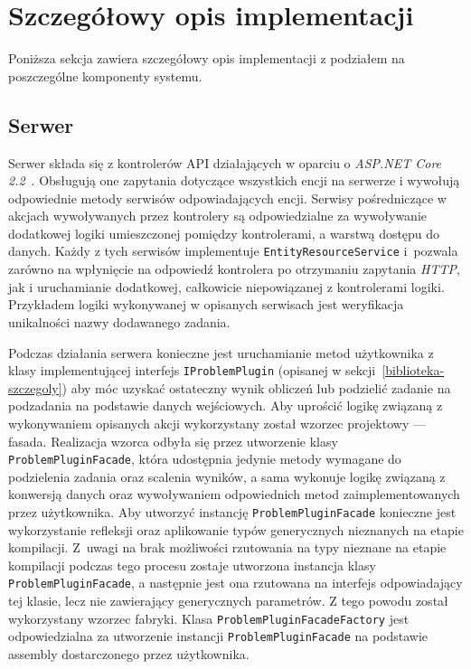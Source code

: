 \documentclass[a4paper,11pt,twoside]{report}
\theoremstyle{definition}
\begin{document}
\section{Szczegółowy opis implementacji}
\label{szczegolowy-opis-implementacji}

Poniższa sekcja zawiera szczegółowy opis implementacji z podziałem na poszczególne komponenty systemu.


\subsection{Serwer}

Serwer składa się z kontrolerów API działających w oparciu o \textit{ASP.NET Core 2.2}~\cite{aspnet-core}.
Obsługują one zapytania dotyczące wszystkich encji na serwerze i wywołują odpowiednie metody serwisów odpowiadających encji.
Serwisy pośredniczące w akcjach wywoływanych przez kontrolery są odpowiedzialne za wywoływanie dodatkowej logiki umieszczonej pomiędzy kontrolerami, a warstwą dostępu do danych.
Każdy z tych serwisów implementuje \texttt{EntityResourceService} i~pozwala zarówno na wpłynięcie na odpowiedź kontrolera po otrzymaniu zapytania \textit{HTTP}, jak i uruchamianie dodatkowej, całkowicie niepowiązanej z kontrolerami logiki.
Przykładem logiki wykonywanej w opisanych serwisach jest weryfikacja unikalności nazwy dodawanego zadania.

Podczas działania serwera konieczne jest uruchamianie metod użytkownika z klasy implementującej interfejs \texttt{IProblemPlugin} (opisanej w sekcji~\ref{biblioteka-szczegoly}) aby móc uzyskać ostateczny wynik obliczeń lub podzielić zadanie na podzadania na podstawie danych wejściowych.
Aby uprościć logikę związaną z wykonywaniem opisanych akcji wykorzystany został wzorzec projektowy --- fasada.
Realizacja wzorca odbyła się przez utworzenie klasy \texttt{ProblemPluginFacade}, która udostępnia jedynie metody wymagane do podzielenia zadania oraz scalenia wyników, a sama wykonuje logikę związaną z konwersją danych oraz wywoływaniem odpowiednich metod zaimplementowanych przez użytkownika.
Aby utworzyć instancję \texttt{ProblemPluginFacade} konieczne jest wykorzystanie refleksji oraz aplikowanie typów generycznych nieznanych na etapie kompilacji.
Z~uwagi na brak możliwości rzutowania na typy nieznane na etapie kompilacji podczas tego procesu zostaje utworzona instancja klasy \texttt{ProblemPluginFacade}, a następnie jest ona rzutowana na interfejs odpowiadający tej klasie, lecz nie zawierający generycznych parametrów.
Z tego powodu został wykorzystany wzorzec fabryki.
Klasa \texttt{ProblemPluginFacadeFactory} jest odpowiedzialna za utworzenie instancji \texttt{ProblemPluginFacade} na podstawie assembly dostarczonego przez użytkownika.
\end{document}
